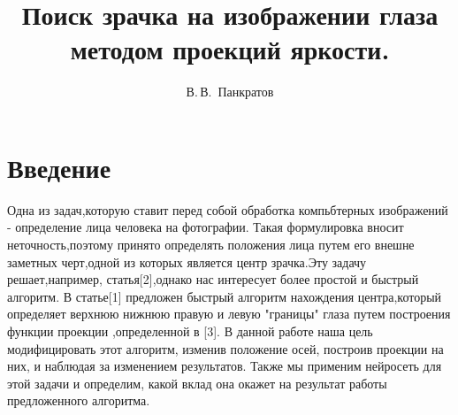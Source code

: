 \documentclass[12pt,a4paper,notitlepage]{article}
\begin{document}
 
\nocite{*}

\title{Поиск зрачка на изображении глаза методом проекций яркости.}
\author{В.\,В.~Панкратов} 
\bigskip


\maketitle


\section{Введение}
	Одна из задач,которую ставит перед собой обработка компьбтерных изображений - определение лица человека на фотографии. Такая формулировка вносит неточность,поэтому принято определять положения лица путем его внешне заметных черт,одной из которых является центр зрачка.Эту задачу решает,например, статья[2],однако нас интересует более простой и быстрый алгоритм. В статье[1] предложен быстрый алгоритм  нахождения центра,который определяет верхнюю нижнюю правую и левую "границы" глаза путем построения функции проекции ,определенной в [3]. В данной работе наша цель модифицировать этот алгоритм, изменив положение осей, построив проекции на них, и наблюдая за изменением результатов. Также мы применим нейросеть для этой задачи и определим, какой вклад она окажет на результат работы предложенного алгоритма. 
\end{document}
